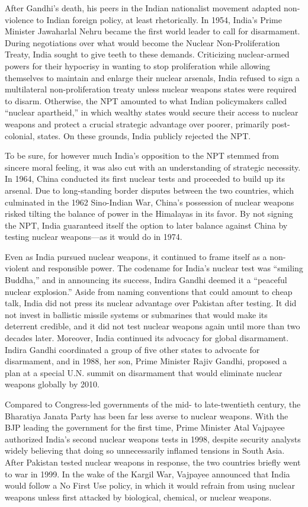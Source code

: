 \documentclass[12pt]{article}
\begin{document}
After Gandhi's death, his peers in the Indian nationalist movement adapted non-violence to Indian foreign policy, at least rhetorically. In 1954, India's Prime Minister Jawaharlal Nehru became the first world leader to call for disarmament. During negotiations over what would become the Nuclear Non-Proliferation Treaty, India sought to give teeth to these demands. Criticizing nuclear-armed powers for their hypocrisy in wanting to stop proliferation while allowing themselves to maintain and enlarge their nuclear arsenals, India refused to sign a multilateral non-proliferation treaty unless nuclear weapons states were required to disarm. Otherwise, the NPT amounted to what Indian policymakers called “nuclear apartheid,” in which wealthy states would secure their access to nuclear weapons and protect a crucial strategic advantage over poorer, primarily post-colonial, states. On these grounds, India publicly rejected the NPT.

To be sure, for however much India's opposition to the NPT stemmed from sincere moral feeling, it was also cut with an understanding of strategic necessity. In 1964, China conducted its first nuclear tests and proceeded to build up its arsenal. Due to long-standing border disputes between the two countries, which culminated in the 1962 Sino-Indian War, China's possession of nuclear weapons risked tilting the balance of power in the Himalayas in its favor. By not signing the NPT, India guaranteed itself the option to later balance against China by testing nuclear weapons—as it would do in 1974. 

Even as India pursued nuclear weapons, it continued to frame itself as a non-violent and responsible power. The codename for India's nuclear test was “smiling Buddha,” and in announcing its success, Indira Gandhi deemed it a “peaceful nuclear explosion.” Aside from naming conventions that could amount to cheap talk, India did not press its nuclear advantage over Pakistan after testing. It did not invest in ballistic missile systems or submarines that would make its deterrent credible, and it did not test nuclear weapons again until more than two decades later. Moreover, India continued its advocacy for global disarmament. Indira Gandhi coordinated a group of five other states to advocate for disarmament, and in 1988, her son, Prime Minister Rajiv Gandhi, proposed a plan at a special U.N. summit on disarmament that would eliminate nuclear weapons globally by 2010. 

Compared to Congress-led governments of the mid- to late-twentieth century, the Bharatiya Janata Party has been far less averse to nuclear weapons. With the BJP leading the government for the first time, Prime Minister Atal Vajpayee authorized India's second nuclear weapons tests in 1998, despite security analysts widely believing that doing so unnecessarily inflamed tensions in South Asia. After Pakistan tested nuclear weapons in response, the two countries briefly went to war in 1999. In the wake of the Kargil War, Vajpayee announced that India would follow a No First Use policy, in which it would refrain from using nuclear weapons unless first attacked by biological, chemical, or nuclear weapons. 
\end{document}
